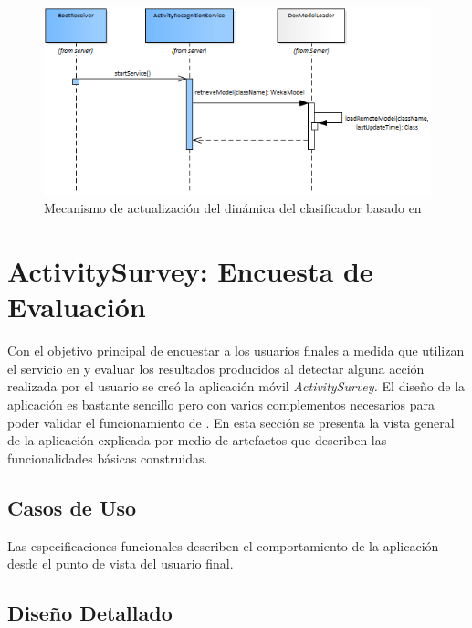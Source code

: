 \begin{figure}
\begin{centering}
\includegraphics[width=1\columnwidth]{capitulo-5/graphics/service_classi}
\par\end{centering}
\caption[Actualización del clasificador WEKA]{\label{fig5:service-classi}Mecanismo de actualización del dinámica
del clasificador basado en }
\end{figure}


\section{ActivitySurvey: Encuesta de Evaluación}

\label{sec55:activity}Con el objetivo principal de encuestar a los
usuarios finales a medida que utilizan el servicio  en
 y evaluar los resultados producidos al detectar alguna
acción realizada por el usuario se creó la aplicación móvil \emph{ActivitySurvey.
}El diseño de la aplicación es bastante sencillo pero con varios complementos
necesarios para poder validar el funcionamiento de .
En esta sección se presenta la vista general de la aplicación explicada
por medio de artefactos que describen las funcionalidades básicas
construidas. 

\subsection{Casos de Uso}

Las especificaciones funcionales describen el comportamiento de la
aplicación desde el punto de vista del usuario final.

\subsection{Diseño Detallado}

